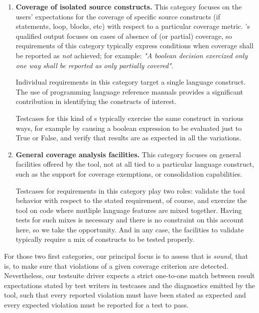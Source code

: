 \documentclass {report}
\begin{document}
\begin{enumerate}
\item \textbf{Coverage of isolated source constructs.}
%
This category focuses on the users' expectations for the coverage of
specific source constructs (if statements, loop, blocks, etc) with respect to
a particular coverage metric.
%
\xcov{}'s qualified output focuses on cases of absence of (or partial)
coverage, so requirements of this category typically express conditions when
coverage shall be reported as \emph{not} achieved;
%
for example: \emph{"A boolean decision exercized only one way shall be
reported as only partially covered"}.

Individual requirements in this category target a single language construct.
%
The use of programming language reference manuals provides a significant
contribution in identifying the constructs of interest.

Testcases for this kind of \tor{}s typically exercise the same construct in
various ways, for example by causing a boolean expression to be evaluated just
to True or False, and verify that results are as expected in all the
variations.

\item \textbf{General coverage analysis facilities.}
%
This category focuses on general facilities offered by the tool, not at all
tied to a particular language construct, such as the support for coverage
exemptions, or consolidation capabilities.

Testcases for requirements in this category play two roles: validate the tool
behavior with respect to the stated requirement, of course, and exercize the
tool on code where mutliple language features are mixed together.
%
Having tests for such mixes is necessary and there is no constraint on this
account here, so we take the opportunity.
% 
And in any case, the facilities to validate typically require a mix of
constructs to be tested properly.
\end{enumerate}

For those two first categories, our principal focus is to assess that \xcov{}
is \emph{sound}, that is, to make sure that violations of a given coverage
criterion are detected.
%
Nevertheless, our testsuite driver expects a strict one-to-one match between
result expectations stated by test writers in testcases and the diagnostics
emitted by the tool, such that every reported violation must have been stated
as expected and every expected violation must be reported for a test to pass.
\end{document}
